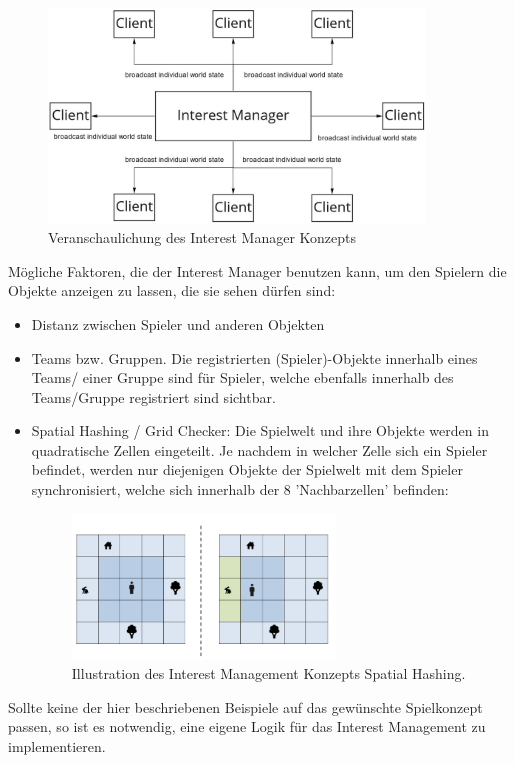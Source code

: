 \begin{figure}[H]
	\centering
	\includegraphics[width=100mm]{images/Interest_Manager.jpg}
	\caption[Interest Manager]{Veranschaulichung des Interest Manager Konzepts}
	\label{pic:Interest_Manager}
\end{figure}

Mögliche Faktoren, die der Interest Manager benutzen kann, um den Spielern die Objekte anzeigen zu lassen, die sie sehen dürfen sind:

\begin{itemize}
	\item Distanz zwischen Spieler und anderen Objekten
	\item Teams bzw. Gruppen. Die registrierten (Spieler)-Objekte innerhalb eines Teams/ einer Gruppe sind für Spieler, welche ebenfalls innerhalb des Teams/Gruppe registriert sind sichtbar.
	\item Spatial Hashing / Grid Checker: Die Spielwelt und ihre Objekte werden in quadratische Zellen eingeteilt. Je nachdem in welcher Zelle sich ein Spieler befindet, werden nur diejenigen Objekte der Spielwelt mit dem Spieler synchronisiert, welche sich innerhalb der 8 'Nachbarzellen' befinden: 
	\begin{figure}[H]
		\centering
		\includegraphics[width=70mm]{images/interest_management.png}
		\caption[Spatial Hashing]{Illustration des Interest Management Konzepts Spatial Hashing. \cite{JeromeRenaux.2017} }
		\label{pic:interest_management}
	\end{figure}
\end{itemize}

Sollte keine der hier beschriebenen Beispiele auf das gewünschte Spielkonzept passen, so ist es notwendig, eine eigene Logik für das Interest Management zu implementieren.
